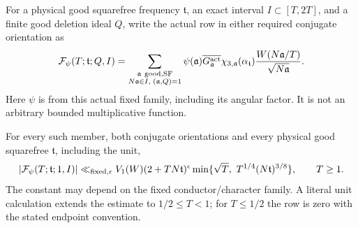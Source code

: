 For a physical good squarefree frequency \(\mathfrak t\), an exact
interval \(I\subset[T,2T]\), and a finite good deletion ideal \(Q\),
write the actual row in either required conjugate orientation as
\begin{equation}\label{rg:row-definition}
 \mathcal F_\psi(T;\mathfrak t;Q,I)
 =\sum_{\substack{\mathfrak a\ {\rm good,SF}\\
                 N\mathfrak a\in I,\;(\mathfrak a,Q)=1}}
 \psi(\mathfrak a)\overline{G_{\mathfrak a}^{\rm act}}
 \chi_{3,\mathfrak a}(\alpha_{\mathfrak t})
                     \frac{W(N\mathfrak a/T)}{\sqrt{N\mathfrak a}} .
\end{equation}
Here \(\psi\) is from this actual fixed family, including its angular
factor. It is not an arbitrary bounded multiplicative function.

\begin{theorem}\label{rg:sharp-row}
For every such member, both conjugate orientations and every physical
good squarefree \(\mathfrak t\), including the unit,
\begin{equation}\label{rg:sharp-bound}
 |\mathcal F_\psi(T;\mathfrak t;1,I)|
 \ll_{\rm fixed,\epsilon} V_1(W)(2+T N\mathfrak t)^\epsilon
       \min\{\sqrt T,\ T^{1/4}(N\mathfrak t)^{3/8}\},
 \qquad T\ge1 .
\end{equation}
The constant may depend on the fixed conductor/character family.
A literal unit calculation extends the estimate to
\(1/2\le T<1\); for \(T\le1/2\) the row is zero with the stated
endpoint convention.
\end{theorem}
